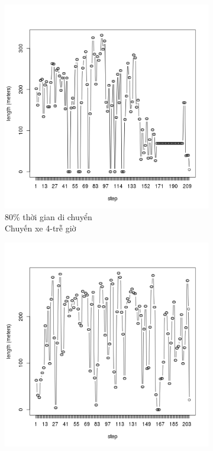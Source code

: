 \documentclass[a4paper, 13pt]{report}
\begin{document}
\begin{figure}
\begin{subfigure}[b]{0.25\textwidth}
                \includegraphics[width=\linewidth]{test4}
                \caption*{80\% thời gian di chuyển\\Chuyến xe 4-trễ giờ}
        \end{subfigure}
        \begin{subfigure}[b]{0.25\textwidth}
                \includegraphics[width=\linewidth]{test5}

\end{subfigure}
\end{figure}
\end{document}
